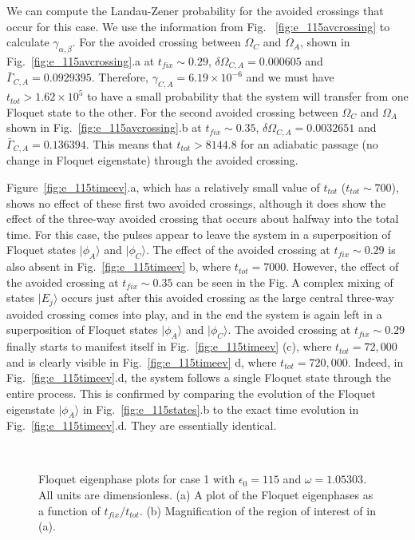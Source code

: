 We can  compute the Landau-Zener probability for the  avoided crossings that occur for this case.  We use the information from Fig. ~\ref{fig:e_115avcrossing} to calculate ${\gamma}_{\alpha,\beta}$. For the  avoided crossing between $\Omega_C$ and $\Omega_A$, shown in Fig.~\ref{fig:e_115avcrossing}.a at $t_{fix} \sim 0.29$,  $\delta\Omega_{C,A}=0.000605$ and ${\bar \Gamma}_{C,A}=0.0929395$. Therefore,  ${\gamma}_{C,A}=6.19{\times}10^{-6}$ and we must have $t_{tot}>1.62{\times}10^5$ to have a small  probability that the system will transfer from one Floquet state to the other.  For the second avoided crossing between $\Omega_C$ and $\Omega_A$ shown in Fig.~\ref{fig:e_115avcrossing}.b  at $t_{fix} \sim 0.35$, $\delta\Omega_{C,A}=0.0032651$ and ${\bar \Gamma}_{C,A}=0.136394$. This  means that $t_{tot}>8144.8$ for an adiabatic passage (no change in Floquet eigenstate) through the avoided crossing. 

Figure~\ref{fig:e_115timeev}.a,  which has a relatively small value of $t_{tot}$ ($t_{tot}{\sim}700$), shows no effect of these first two avoided crossings, although  it does show the effect of the three-way avoided crossing that  occurs about halfway into the total time. For this case,  the pulses appear to leave the system in a superposition of Floquet states $|{\phi}_A{\rangle}$ and $|{\phi}_C{\rangle}$.   The effect of the avoided crossing at $t_{fix}{\sim}0.29$  is also absent in Fig.~\ref{fig:e_115timeev} b, where $t_{tot}=7000$.  However, the effect of the  avoided crossing at $t_{fix} \sim 0.35$ can be seen in the Fig.  A complex mixing of states $|E_j{\rangle}$ occurs just after this avoided crossing as the large central three-way avoided crossing comes into play, and in the end the system is again left in a superposition of Floquet states $|{\phi}_A{\rangle}$ and $|{\phi}_C{\rangle}$.   The avoided crossing at $t_{fix}{\sim}0.29$ finally  starts to manifest itself in Fig.~\ref{fig:e_115timeev} (c), where $t_{tot}=72,000$ and is clearly visible in Fig.~\ref{fig:e_115timeev} d, where $t_{tot}=720,000$.  Indeed, in  Fig.~\ref{fig:e_115timeev}.d,  the system follows a single Floquet state through the entire process.  This is  confirmed by comparing the evolution of the Floquet eigenstate $|\phi_A{\rangle}$ in Fig.~\ref{fig:e_115states}.b to the exact time evolution in Fig.~\ref{fig:e_115timeev}.d.  They are essentially identical.

\begin{figure} 
\ 
\caption{Floquet eigenphase plots for case 1 with $\epsilon_0=115$ and  $\omega=1.05303$. All units are dimensionless.  (a) A  plot of the Floquet eigenphases as a function of $t_{fix}/t_{tot}$. (b) Magnification of the region of interest of in (a).}
\label{fig:e_115phase}
\end{figure}

